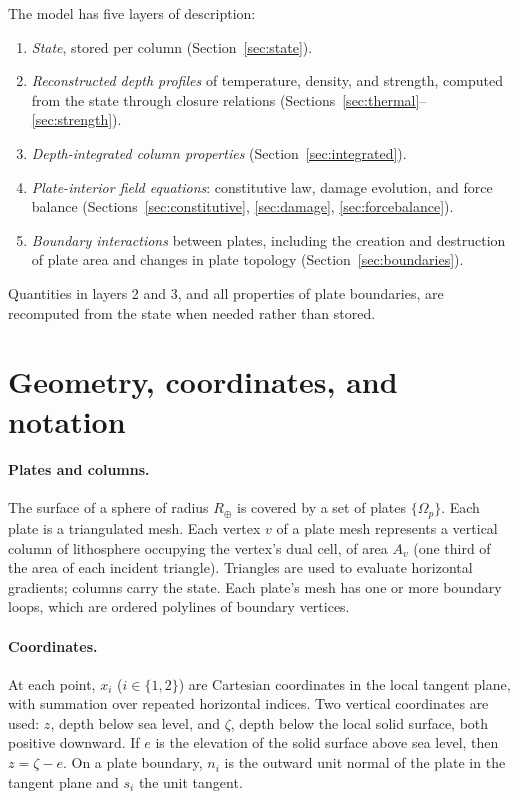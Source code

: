 \documentclass[11pt]{article}
\begin{document}
The model has five layers of description:
\begin{enumerate}
  \item \emph{State}, stored per column (Section~\ref{sec:state}).
  \item \emph{Reconstructed depth profiles} of temperature, density, and
        strength, computed from the state through closure relations
        (Sections~\ref{sec:thermal}--\ref{sec:strength}).
  \item \emph{Depth-integrated column properties}
        (Section~\ref{sec:integrated}).
  \item \emph{Plate-interior field equations}: constitutive law, damage
        evolution, and force balance
        (Sections~\ref{sec:constitutive}, \ref{sec:damage},
        \ref{sec:forcebalance}).
  \item \emph{Boundary interactions} between plates, including the creation and
        destruction of plate area and changes in plate topology
        (Section~\ref{sec:boundaries}).
\end{enumerate}
Quantities in layers 2 and 3, and all properties of plate boundaries, are
recomputed from the state when needed rather than stored.

\section{Geometry, coordinates, and notation}

\paragraph{Plates and columns.}
The surface of a sphere of radius $R_\oplus$ is covered by a set of plates
$\{\Omega_p\}$. Each plate is a triangulated mesh. Each vertex $v$ of a plate
mesh represents a vertical column of lithosphere occupying the vertex's dual
cell, of area $A_v$ (one third of the area of each incident triangle).
Triangles are used to evaluate horizontal gradients; columns carry the state.
Each plate's mesh has one or more boundary loops, which are ordered polylines of
boundary vertices.

\paragraph{Coordinates.}
At each point, $x_i$ ($i\in\{1,2\}$) are Cartesian coordinates in the local
tangent plane, with summation over repeated horizontal indices. Two vertical
coordinates are used: $z$, depth below sea level, and $\zeta$, depth below the
local solid surface, both positive downward. If $e$ is the elevation of the
solid surface above sea level, then $z = \zeta - e$. On a plate boundary, $n_i$
is the outward unit normal of the plate in the tangent plane and $s_i$ the unit
tangent.
\end{document}
